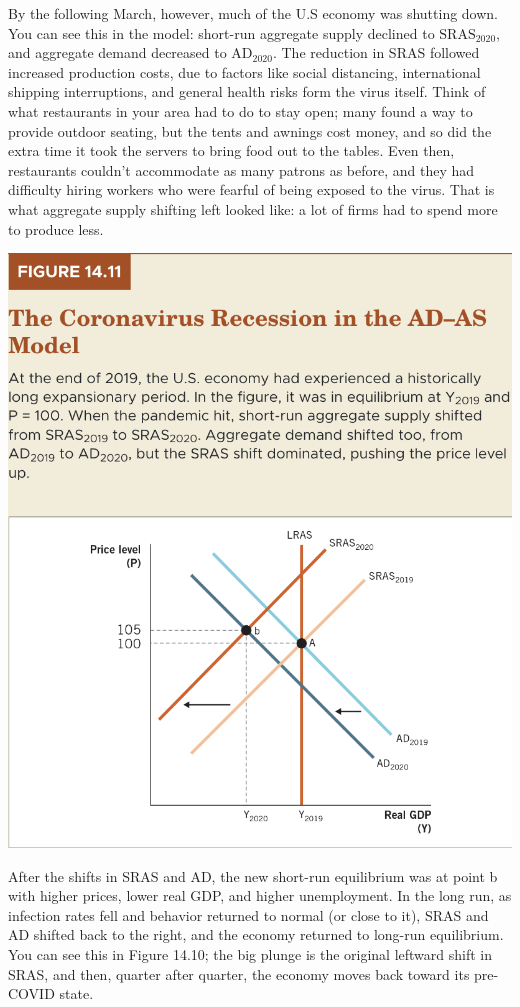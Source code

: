 \documentclass[11pt]{article} %
\begin{document}
By the following March, however, much of the U.S economy was shutting down. You can see this in the model: short-run aggregate supply declined to \(\text{SRAS}_{2020}\), and aggregate demand decreased to \(\text{AD}_{2020}\). The reduction in SRAS followed increased production costs, due to factors like social distancing, international shipping interruptions, and general health risks form the virus itself. Think of what restaurants in your area had to do to stay open; many found a way to provide outdoor seating, but the tents and awnings cost money, and so did the extra time it took the servers to bring food out to the tables. Even then, restaurants couldn't accommodate as many patrons as before, and they had difficulty hiring workers who were fearful of being exposed to the virus. That is what aggregate supply shifting left looked like: a lot of firms had to spend more to produce less.

\begin{center}
\includegraphics[scale=0.5]{images/Figure 14.11.png}
\end{center}
After the shifts in SRAS and AD, the new short-run equilibrium was at point b with higher prices, lower real GDP, and higher unemployment. In the long run, as infection rates fell and behavior returned to normal (or close to it), SRAS and AD shifted back to the right, and the economy returned to long-run equilibrium. You can see this in Figure 14.10; the big plunge is the original leftward shift in SRAS, and then, quarter after quarter, the economy moves back toward its pre-COVID state.
\end{document}
